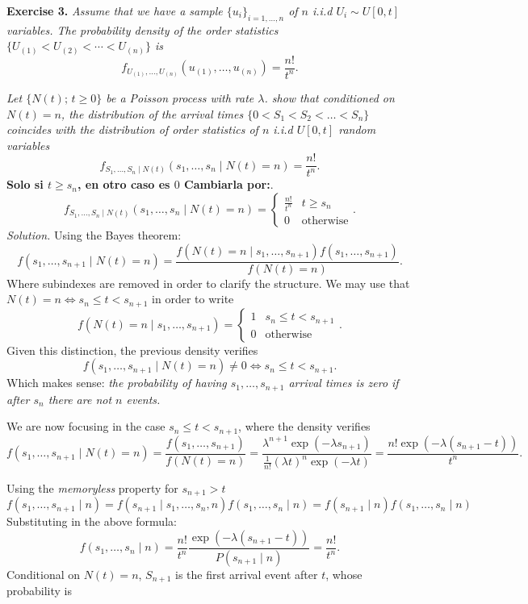 
\textbf{Exercise 3. }\emph{Assume that we have a sample \( \{u_{i}\}_{i=1,\dots,n} \) of \( n \) i.i.d  \(U_{i} \sim U[0, t] \) variables. The probability density of the order statistics \( \{U_{(1)} < U_{(2)} < \cdots < U_{(n)}\} \)  is}
\[
  f_{U_{(1)},\dots,U_{(n)}}(u_{(1)},\dots,u_{(n)}) = \frac{n!}{t^{n}}.
\]

\emph{Let \( \{N(t); \, t \geq 0\} \) be a Poisson process with rate \( \lambda \). show that conditioned on \( N(t) = n \), the distribution of the arrival times \( \{0 < S_{1} < S_{2} < \dots < S_{n}\} \) coincides with the distribution of order statistics of \( n \) i.i.d \( U[0, t] \) random variables}
\[
  f_{S_{1},\dots,S_{n} \mid N(t)}(s_{1},\dots, s_{n} \mid N(t) = n) = \frac{n!}{t^{n}}.
\]
\textbf{Solo si \( t \geq s_{n} \), en otro caso es \( 0 \) Cambiarla por:}.
\[
  f_{S_{1},\dots,S_{n} \mid N(t)}(s_{1},\dots, s_{n} \mid N(t) = n) = \begin{cases} \frac{n!}{t^{n}} &t \geq s_{n}\\ 0 &\text{otherwise} \end{cases}.
\]
\emph{Solution. } Using the Bayes theorem:
\[
  f(s_{1},\dots, s_{n+1} \mid N(t) = n) = \frac{ f(N(t) = n \mid s_{1},\dots, s_{n+1}) f(s_{1},\dots, s_{n+1})  }{ f(N(t) = n)  }.
\]
Where subindexes are removed in order to clarify the structure. We may use that \( N(t) = n \iff s_{n} \leq t < s_{n+1} \) in order to write
\[
  f(N(t) = n \mid s_{1},\dots, s_{n+1}) = \begin{cases} 1 & s_{n} \leq t < s_{n+1}\\ 0 &\text{otherwise} \end{cases}.
\]
Given this distinction, the previous density verifies
\[
   f(s_{1},\dots,s_{n+1} \mid N(t) = n) \neq 0 \iff s_{n} \leq t < s_{n+1}.
 \]
 Which makes sense: \emph{the probability of having \( s_{1},\dots,s_{n+1} \) arrival times is zero if after \( s_{n} \) there are not \( n \) events.}

 We are now focusing in the case \( s_{n} \leq t < s_{n+1} \), where the density verifies
 \[
    f(s_{1},\dots, s_{n+1} \mid N(t) = n) = \frac{ f(s_{1},\dots, s_{n+1})  }{ f(N(t) = n)  } = \frac{\lambda ^{n+1} \exp(-\lambda s_{n+1})}{\frac{1}{n!} (\lambda t)^{n} \exp (- \lambda t)} = \frac{n! \exp(-\lambda (s_{n+1}-t))}{t^{n}}.
 \]

Using the \emph{memoryless} property for \( s_{n+1} > t \)
\[
  f(s_{1},\dots,s_{n+1} \mid n) = f(s_{n+1} \mid s_{1},\dots, s_{n}, n)f(s_{1},\dots,s_{n}\mid n) = f(s_{n+1} \mid n)f(s_{1},\dots,s_{n}\mid n)
\]
Substituting in the above formula:
\[
  f(s_{1},\dots,s_{n}\mid n) = \frac{n!}{t^{n}} \frac{\exp(-\lambda (s_{n+1}-t))}{P(s_{n+1} \mid n) } = \frac{n!}{t^{n}}.
\]
Conditional on \( N(t) = n \), \( S_{n+1} \) is the first arrival event after \( t \), whose probability is
